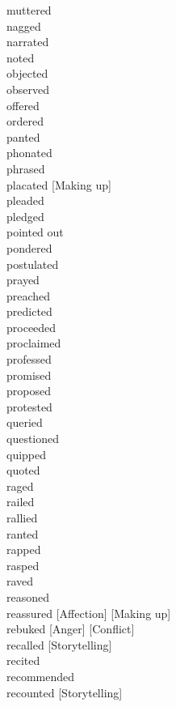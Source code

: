 \documentclass[a4paper,12pt,fleqn]{book}\usepackage{polyglossia}\setdefaultlanguage[babelshorthands=true]{russian}\setotherlanguage{english}\defaultfontfeatures{Ligatures=TeX,Mapping=tex-text}\usepackage{xcolor}\newcommand{\ml}[3]{#2}
\begin{document}
{muttered \hfill \\
nagged \hfill \\
narrated \hfill \\
noted \hfill \\
objected \hfill \\
observed \hfill \\
offered \hfill \\
ordered \hfill \\
panted \hfill \\
phonated \hfill \\
phrased \hfill \\
placated [Making up] \hfill \\
pleaded \hfill \\
pledged \hfill \\
pointed out \hfill \\
pondered \hfill \\
postulated \hfill \\
prayed \hfill \\
preached \hfill \\
predicted \hfill \\
proceeded \hfill \\
proclaimed \hfill \\
professed \hfill \\
promised \hfill \\
proposed \hfill \\
protested \hfill \\
queried \hfill \\
questioned \hfill \\
quipped \hfill \\
quoted \hfill \\
raged \hfill \\
railed \hfill \\
rallied \hfill \\
ranted \hfill \\
rapped \hfill \\
rasped \hfill \\
raved \hfill \\
reasoned \hfill \\
reassured [Affection] [Making up] \hfill \\
rebuked [Anger] [Conflict] \hfill \\
recalled [Storytelling] \hfill \\
recited \hfill \\
recommended \hfill \\
recounted [Storytelling] \hfill \\
}
\end{document}
